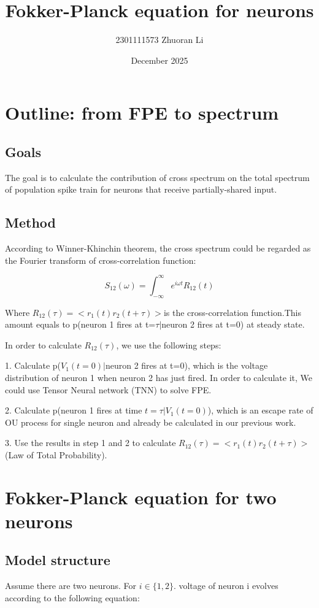 \documentclass{article}
\title{Fokker-Planck equation for neurons}
\author{2301111573 Zhuoran Li}
\date{December 2025}
\begin{document}
	\maketitle
	\section{Outline: from FPE to spectrum}
    \subsection{Goals}
	The goal is to calculate the contribution of cross spectrum on the total spectrum of population spike train for neurons that receive partially-shared input.
	\subsection{Method}
	According to Winner-Khinchin theorem, the cross spectrum could be regarded as the Fourier transform of cross-correlation function:
	
	\begin{equation}
		S_{12}(\omega)=\int_{-\infty}^{\infty}e^{i\omega t}R_{12}(t)
	\end{equation}
	
	Where $R_{12}(\tau)=<r_1(t)r_2(t+\tau)>$is the cross-correlation function.This amount equals to p(neuron 1 fires at t=$\tau|$neuron 2 fires at t=0) at steady state.
	
	In order to calculate $R_{12}(\tau)$, we use the following steps:
	
	
	1. Calculate p($V_1(t=0)|$neuron 2 fires at t=0), which is the voltage distribution of neuron 1 when neuron 2 has just fired. In order to calculate it, We could use Tensor Neural network (TNN) to solve FPE.
	
	2. Calculate p(neuron 1 fires at time $t=\tau|V_1(t=0)$), which is an escape rate of OU process for single neuron and already be calculated in our previous work.
	
	3. Use the results in step 1 and 2 to calculate $R_{12}(\tau)=<r_1(t)r_2(t+\tau)>$ (Law of Total Probability).
	
	\section{Fokker-Planck equation for two neurons}

	
	\subsection{Model structure}
	Assume there are two neurons. For $i\in \{1,2\}$. voltage of neuron i evolves according to the following equation:
	
\end{document}
